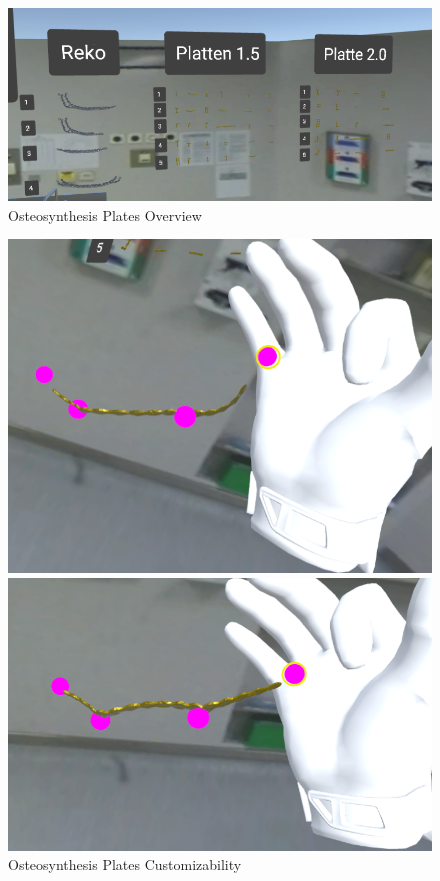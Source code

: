 \begin{figure}[ht!]
    \centering
    \includegraphics[width=\linewidth]{images/implementation/features/procedures/metal_plates_1.png}
    \caption{\label{fig::FeatureMetalPlate} Osteosynthesis Plates Overview}
\end{figure}

\begin{figure}
    \centering
    \begin{minipage}{.5\textwidth}
      \centering
      \includegraphics[width=0.95\linewidth]{images/implementation/features/procedures/metal_plates_2.png}
    \end{minipage}%
    \begin{minipage}{.5\textwidth}
      \centering
      \includegraphics[width=0.95\linewidth]{images/implementation/features/procedures/metal_plates_3.png}
    \end{minipage}
    \caption{\label{fig::FeatureMetalPlate}Osteosynthesis Plates Customizability}
\end{figure}
